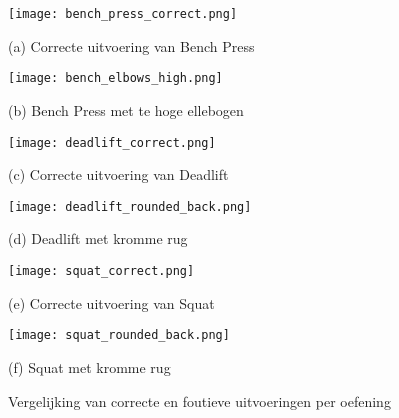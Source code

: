 \begin{figure}[H]
    \centering

    \begin{minipage}{0.45\textwidth}
        \centering
        \texttt{[image: bench\_press\_correct.png]}
        \caption*{(a) Correcte uitvoering van Bench Press}
        \label{fig:bench_correct_combined}
    \end{minipage}
    \hfill
    \begin{minipage}{0.45\textwidth}
        \centering
        \texttt{[image: bench\_elbows\_high.png]}
        \caption*{(b) Bench Press met te hoge ellebogen}
        \label{fig:bench_elbows_high_combined}
    \end{minipage}

    \vspace{1em}

    \begin{minipage}{0.45\textwidth}
        \centering
        \texttt{[image: deadlift\_correct.png]}
        \caption*{(c) Correcte uitvoering van Deadlift}
        \label{fig:deadlift_correct_combined}
    \end{minipage}
    \hfill
    \begin{minipage}{0.45\textwidth}
        \centering
        \texttt{[image: deadlift\_rounded\_back.png]}
        \caption*{(d) Deadlift met kromme rug}
        \label{fig:deadlift_rounded_back_combined}
    \end{minipage}

    \vspace{1em}

    \begin{minipage}{0.45\textwidth}
        \centering
        \texttt{[image: squat\_correct.png]}
        \caption*{(e) Correcte uitvoering van Squat}
        \label{fig:squat_correct_combined}
    \end{minipage}
    \hfill
    \begin{minipage}{0.45\textwidth}
        \centering
        \texttt{[image: squat\_rounded\_back.png]}
        \caption*{(f) Squat met kromme rug}
        \label{fig:squat_rounded_back_combined}
    \end{minipage}

    \caption{Vergelijking van correcte en foutieve uitvoeringen per oefening}
    \label{fig:combined_comparison}
\end{figure}
